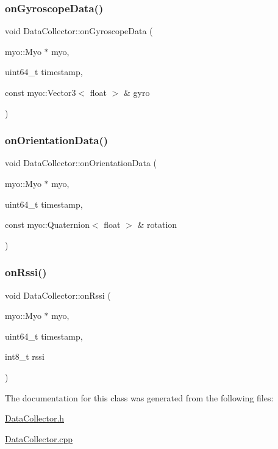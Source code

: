 \mbox{\label{class_data_collector_a46ee5fda02554a8d84a0f449026dcfac}} 
\subsubsection{\texorpdfstring{on\+Gyroscope\+Data()}{onGyroscopeData()}}
{\footnotesize\ttfamily void Data\+Collector\+::on\+Gyroscope\+Data (\begin{DoxyParamCaption}\item[{myo\+::\+Myo $\ast$}]{myo,  }\item[{uint64\+\_\+t}]{timestamp,  }\item[{const myo\+::\+Vector3$<$ float $>$ \&}]{gyro }\end{DoxyParamCaption})}

\mbox{\label{class_data_collector_a7e54df882eed064e4059b3361dff796f}} 
\subsubsection{\texorpdfstring{on\+Orientation\+Data()}{onOrientationData()}}
{\footnotesize\ttfamily void Data\+Collector\+::on\+Orientation\+Data (\begin{DoxyParamCaption}\item[{myo\+::\+Myo $\ast$}]{myo,  }\item[{uint64\+\_\+t}]{timestamp,  }\item[{const myo\+::\+Quaternion$<$ float $>$ \&}]{rotation }\end{DoxyParamCaption})}

\mbox{\label{class_data_collector_aff0d95e10b014c460bf859abd6a01f74}} 
\subsubsection{\texorpdfstring{on\+Rssi()}{onRssi()}}
{\footnotesize\ttfamily void Data\+Collector\+::on\+Rssi (\begin{DoxyParamCaption}\item[{myo\+::\+Myo $\ast$}]{myo,  }\item[{uint64\+\_\+t}]{timestamp,  }\item[{int8\+\_\+t}]{rssi }\end{DoxyParamCaption})}



The documentation for this class was generated from the following files\+:\begin{DoxyCompactItemize}
\item 
\mbox{\hyperlink{_data_collector_8h}{Data\+Collector.\+h}}\item 
\mbox{\hyperlink{_data_collector_8cpp}{Data\+Collector.\+cpp}}\end{DoxyCompactItemize}
